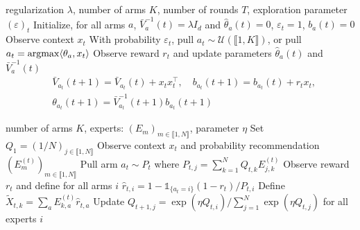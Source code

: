 \begin{algorithm}[h]
  \caption{\epsgreedy}
  \label{alg:egreedy}
\begin{algorithmic}
   regularization  $\lambda$, number of arms $K$, number of rounds $T$, exploration parameter $(\varepsilon)_{t}$
	\STATE Initialize, for all arms $a$, $\bar{V}_{a}^{-1}(t) = \lambda I_{d}$ and $\hat{\theta}_{a}(t) = 0$, $\varepsilon_{t} = 1$, $b_{a}(t) = 0$
  \STATE Observe context $x_{t}$
  \STATE With probability $\varepsilon_{t}$, pull $a_{t} \sim \mathcal{U}\left(\llbracket 1,K\rrbracket\right)$, or pull $a_{t} = \operatorname*{argmax} \langle \theta_{a}, x_{t}\rangle$ 
  \STATE Observe reward $r_{t}$ and update parameters $\hat{\theta}_{a}(t)$ and $\bar{V}_{a}^{-1}(t)$
    \begin{align*}
      &\bar{V}_{a_{t}}(t+1) = \bar{V}_{a_{t}}(t) + x_{t}x_{t}^{\intercal},\quad b_{a_{t}}(t+1) = b_{a_{t}}(t) + r_{t}x_{t},\\
      &\theta_{a_{t}}(t+1) = \bar{V}_{a_{t}}^{-1}(t+1)b_{a_{t}}(t+1)
  \end{align*}
  \ENDFOR
\end{algorithmic}
\end{algorithm}

\begin{algorithm}[h]
  \caption{\expfour}
  \label{alg:exp4}
\begin{algorithmic}
	 number of arms $K$, experts: $(E_{m})_{m\in\llbracket 1, N\rrbracket}$, parameter $\eta$
  \STATE Set $Q_{1} = (1/N)_{j\in\llbracket 1, N\rrbracket}$
  \STATE Observe context $x_{t}$ and probability recommendation $(E_{m}^{(t)})_{m\in\llbracket 1, N\rrbracket}$
  \STATE Pull arm $a_{t}\sim P_{t}$ where $P_{t,j} = \sum_{k=1}^{N} Q_{t,k}E_{j,k}^{(t)}$ 
  \STATE Observe reward $r_{t}$ and define for all arms $i$ $\hat{r}_{t,i} = 1 - \mathds{1}_{\{ a_{t}=i\}}( 1 - r_{t})/P_{t,i}$
  \STATE Define $\tilde{X}_{t,k} = \sum_{a} E_{k, a}^{(t)}\hat{r}_{t,a}$
  \STATE Update $Q_{t+1, j} = \exp(\eta Q_{t,i})/\sum_{j=1}^{N} \exp(\eta Q_{t,j})$ for all experts $i$
  \ENDFOR
\end{algorithmic}
\end{algorithm}
